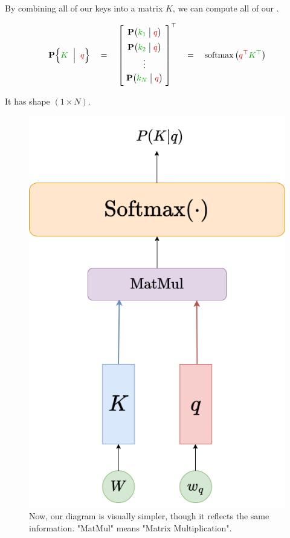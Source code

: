         \begin{kequation}
            By combining all of our keys into a matrix $K$, we can compute all of our  .

            \begin{equation*}
                \given{ \grn{K} }{ \red{q} }  \quad=\quad
                \begin{bmatrix}
                    \phantom{\Big|} 
                    \mathbf{P} \big( \grn{k_1} \;\big|\; \red{q} \big) \phantom{\Big|} \\
                    \phantom{\Big|}
                    \mathbf{P} \big( \grn{k_2} \;\big|\; \red{q} \big) 
                    \phantom{\Big|}\\
                    \vdots \\
                    \phantom{\Big|}
                    \mathbf{P} \big( \grn{k_N} \;\big|\; \red{q} \big) 
                    \phantom{\Big|}\\
                \end{bmatrix}^\top
                \quad=\quad
                \operatorname{softmax} \big( \red{q^\top}\grn{K^\top} \big)
            \end{equation*}

            It has shape $(1 \times N)$.
        \end{kequation}



        \begin{figure}[H]
            \centering
            \includegraphics[width=0.3\linewidth]{images/transformers_images/condensed_attention_weights.png}
            \caption*{Now, our diagram is visually simpler, though it reflects the same information. "MatMul" means "Matrix Multiplication".}
        \end{figure}


